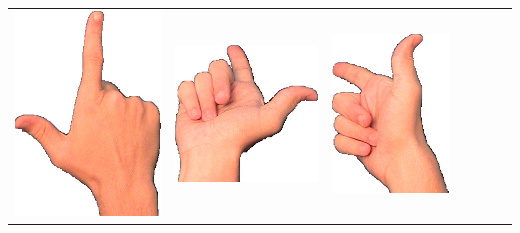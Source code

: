 \documentclass{article}
\begin{document}
\begin{center}
\begin{tabular}{r*{6}{c}}
\includegraphics[scale=0.1]{images/09-03-3.jpg}&
\includegraphics[scale=0.1]{images/09-03-4.jpg}&
\includegraphics[scale=0.1]{images/09-03-5.jpg}&

\end{tabular}
\end{center}
\end{document}

